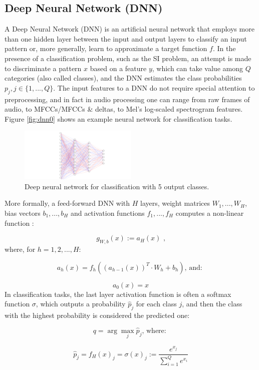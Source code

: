\subsection{Deep Neural Network (DNN)}\label{subsec:dnn}
A Deep Neural Network (DNN) is an artificial neural network that employs more than one hidden layer between the input and output layers to classify an input pattern or, more generally, learn to approximate a target function $f$. In the presence of a classification problem, such as the SI problem, an attempt is made to discriminate a pattern $x$ based on a feature $y$, which can take value among $Q$ categories (also called classes), and the DNN estimates the class probabilities $p_j, j \in \{1, ..., Q\}$. The input features to a DNN do not require special attention to preprocessing, and in fact in audio processing one can range from raw frames of audio, to MFCCs/MFCCs \& deltas, to Mel's log-scaled spectrogram features. Figure \vref{fig:dnn0} shows an example neural network for classification tasks.

\begin{figure}
	\includegraphics[width=0.5\textwidth]{images/nn}
	\caption{Deep neural network for classification with 5 output classes.}
	\label{fig:dnn0}
\end{figure}

More formally, a feed-forward DNN with $H$ layers, weight matrices $W_1, ..., W_H$, bias vectors $b_1, ..., b_H$ and activation functions $f_1, ..., f_H$ computes a non-linear function \cite{si:dnnhmm}:

$$g_{W, b}(x) := a_H(x) \text{ ,}$$
where, for $h = 1, 2, ..., H$: 

$$a_h(x) = f_h((a_{h-1}(x))^T \cdot W_h + b_h) \text{, and: }$$

$$a_0(x) = x$$
In classification tasks, the last layer activation function is often a softmax function $\sigma$, which outputs a probability $\hat{p}_j$ for each class $j$, and then the class with the highest probability is considered the predicted one:

$$q = \arg \max_j \hat{p}_j \text{, where: }$$

$$\hat{p}_j = f_H(x)_j = \sigma(x)_j := \frac{e^{x_j}}{\sum_{i=1}^{Q}e^{x_i}}$$

